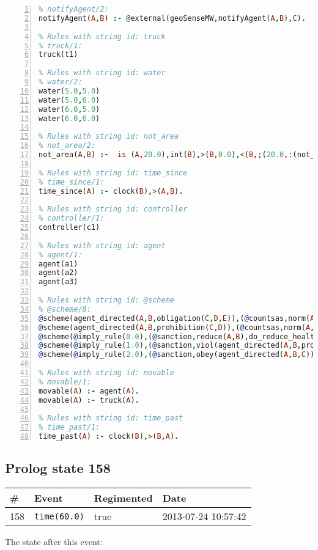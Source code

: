 \documentclass[11pt]{article}\usepackage[utf8]{inputenc}\usepackage{geometry}
\begin{document}
\begin{lstlisting}[language=Prolog, numbers=left]
% Rules with string id: notifyAgent
% notifyAgent/2:
notifyAgent(A,B) :- @external(geoSenseMW,notifyAgent(A,B),C).

% Rules with string id: truck
% truck/1:
truck(t1)

% Rules with string id: water
% water/2:
water(5.0,5.0)
water(5.0,6.0)
water(6.0,5.0)
water(6.0,6.0)

% Rules with string id: not_area
% not_area/2:
not_area(A,B) :-  is (A,20.0),int(B),>(B,0.0),<(B,;(20.0,:(not_area(A,B), is (-(B),20.0)))),int(A),>(A,0.0),<(A,;(20.0,:(area(A,B),-(int(A))))),int(B),>(A,0.0),>(B,0.0),<(A,21.0),<(B,21.0).

% Rules with string id: time_since
% time_since/1:
time_since(A) :- clock(B),>(A,B).

% Rules with string id: controller
% controller/1:
controller(c1)

% Rules with string id: agent
% agent/1:
agent(a1)
agent(a2)
agent(a3)

% Rules with string id: @scheme
% @scheme/8:
@scheme(agent_directed(A,B,obligation(C,D,E)),(@countsas,norm(A,B,F,obligation(C,D,E)),F),false,(listTrue(C)),(time_past(D)),false,[plus(viol(agent_directed(A,B,obligation(C,D,E))))|[]],[plus(obey(agent_directed(A,B,obligation(C,D,E))))|[]])
@scheme(agent_directed(A,B,prohibition(C,D)),(@countsas,norm(A,B,E,prohibition(C,D)),E),(listTrue(C)),false,(false),false,[plus(viol(agent_directed(A,B,prohibition(C,D))))|[]],[plus(obey(agent_directed(A,B,prohibition(C,D))))|[]])
@scheme(@imply_rule(0.0),(@sanction,reduce(A,B),do_reduce_health(A,B),notifyAgent(A,changed(status))),true,false,false,false,[min(reduce(A,B))|[]],[])
@scheme(@imply_rule(1.0),(@sanction,viol(agent_directed(A,B,prohibition(C,D))),do_sanction(D)),true,false,false,false,[min(viol(agent_directed(A,B,prohibition(C,D))))|[]],[])
@scheme(@imply_rule(2.0),(@sanction,obey(agent_directed(A,B,C))),true,false,false,false,[min(obey(agent_directed(A,B,C)))|[]],[])

% Rules with string id: movable
% movable/1:
movable(A) :- agent(A).
movable(A) :- truck(A).

% Rules with string id: time_past
% time_past/1:
time_past(A) :- clock(B),>(B,A).

\end{lstlisting}
\clearpage 
\subsection{Prolog state 158}
\begin{table}[ht]
\centering 
\begin{tabular}{l l l l} 
\textbf{\#} & \textbf{Event} & \textbf{Regimented} & \textbf{Date} \\ [0.5ex] 
\hline
158&\texttt{time(60.0)}&true&2013-07-24 10:57:42\\ [1ex] \hline\end{tabular}
\end{table}
The state after this event:
\end{document}
